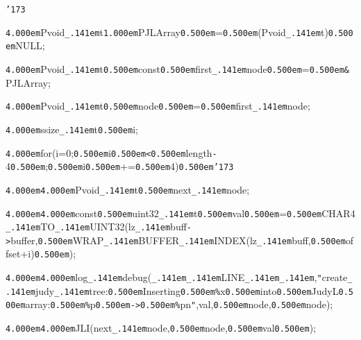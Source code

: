 \noindent
{}{\tt\char'173}

\noindent
{}{\tt\mc \kern4.000em}Pvoid{\tt\_\kern.141em}t{\tt\mc \kern1.000em}PJLArray{\tt\mc \kern0.500em}={\tt\mc \kern0.500em}(Pvoid{\tt\_\kern.141em}t){\tt\mc \kern0.500em}NULL;

\noindent
{}{\tt\mc \kern4.000em}Pvoid{\tt\_\kern.141em}t{\tt *}{\tt\mc \kern0.500em}const{\tt\mc \kern0.500em}first{\tt\_\kern.141em}node{\tt\mc \kern0.500em}={\tt\mc \kern0.500em}{\tt\&}PJLArray;

\noindent
{}{\tt\mc \kern4.000em}Pvoid{\tt\_\kern.141em}t{\tt *}{\tt\mc \kern0.500em}node{\tt\mc \kern0.500em}={\tt\mc \kern0.500em}first{\tt\_\kern.141em}node;

\noindent
{}{\tt\mc \kern4.000em}ssize{\tt\_\kern.141em}t{\tt\mc \kern0.500em}i;

\noindent
{}\hfill

\noindent
{}{\tt\mc \kern4.000em}for(i=0;{\tt\mc \kern0.500em}i{\tt\mc \kern0.500em}{\tt <}{\tt\mc \kern0.500em}length{\tt -}4{\tt\mc \kern0.500em};{\tt\mc \kern0.500em}i{\tt\mc \kern0.500em}+={\tt\mc \kern0.500em}4){\tt\mc \kern0.500em}{\tt\char'173}

\noindent
{}{\tt\mc \kern4.000em}{\tt\mc \kern4.000em}Pvoid{\tt\_\kern.141em}t{\tt *}{\tt\mc \kern0.500em}next{\tt\_\kern.141em}node;

\noindent
{}{\tt\mc \kern4.000em}{\tt\mc \kern4.000em}const{\tt\mc \kern0.500em}uint32{\tt\_\kern.141em}t{\tt\mc \kern0.500em}val{\tt\mc \kern0.500em}={\tt\mc \kern0.500em}CHAR4{\tt\_\kern.141em}TO{\tt\_\kern.141em}UINT32(lz{\tt\_\kern.141em}buff{\tt -}{\tt >}buffer,{\tt\mc \kern0.500em}WRAP{\tt\_\kern.141em}BUFFER{\tt\_\kern.141em}INDEX(lz{\tt\_\kern.141em}buff,{\tt\mc \kern0.500em}offset+i){\tt\mc \kern0.500em});

\noindent
{}\hfill

\noindent
{}{\tt\mc \kern4.000em}{\tt\mc \kern4.000em}log{\tt\_\kern.141em}debug({\tt\_\kern.141em}{\tt\_\kern.141em}LINE{\tt\_\kern.141em}{\tt\_\kern.141em},{\tt "}create{\tt\_\kern.141em}judy{\tt\_\kern.141em}tree:{\tt\mc \kern0.500em}Inserting{\tt\mc \kern0.500em}{\tt\%}x{\tt\mc \kern0.500em}into{\tt\mc \kern0.500em}JudyL{\tt\mc \kern0.500em}array:{\tt\mc \kern0.500em}{\tt\%}p{\tt\mc \kern0.500em}{\tt -}{\tt >}{\tt\mc \kern0.500em}{\tt\%}p{\tt{}}n{\tt "},val,{\tt\mc \kern0.500em}node,{\tt\mc \kern0.500em}{\tt *}node);

\noindent
{}\hfill

\noindent
{}{\tt\mc \kern4.000em}{\tt\mc \kern4.000em}JLI(next{\tt\_\kern.141em}node,{\tt\mc \kern0.500em}{\tt *}node,{\tt\mc \kern0.500em}val{\tt\mc \kern0.500em});

